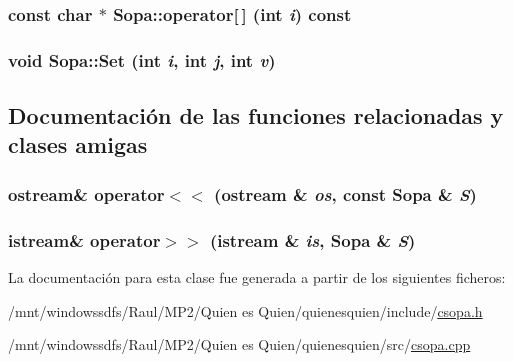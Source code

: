 \hypertarget{class_sopa_9b09ad8b8f618a7a21d93c074aba4b07}{
\subsubsection[{operator[]}]{\setlength{\rightskip}{0pt plus 5cm}const char $\ast$ Sopa::operator\mbox{[}$\,$\mbox{]} (int {\em i}) const}}
\label{class_sopa_9b09ad8b8f618a7a21d93c074aba4b07}


\hypertarget{class_sopa_47815b3d8dda011e75749387b43bfa92}{
\subsubsection[{Set}]{\setlength{\rightskip}{0pt plus 5cm}void Sopa::Set (int {\em i}, \/  int {\em j}, \/  int {\em v})}}
\label{class_sopa_47815b3d8dda011e75749387b43bfa92}




\subsection{Documentación de las funciones relacionadas y clases amigas}
\hypertarget{class_sopa_b487f8c25d6a206ddd694026397c2b5c}{
\subsubsection[{operator$<$$<$}]{\setlength{\rightskip}{0pt plus 5cm}ostream\& operator$<$$<$ (ostream \& {\em os}, \/  const {\bf Sopa} \& {\em S})}}
\label{class_sopa_b487f8c25d6a206ddd694026397c2b5c}


\hypertarget{class_sopa_18c0ca8c237f9bf2c95d59ba29c3cba4}{
\subsubsection[{operator$>$$>$}]{\setlength{\rightskip}{0pt plus 5cm}istream\& operator$>$$>$ (istream \& {\em is}, \/  {\bf Sopa} \& {\em S})}}
\label{class_sopa_18c0ca8c237f9bf2c95d59ba29c3cba4}




La documentación para esta clase fue generada a partir de los siguientes ficheros:\begin{CompactItemize}
\item 
/mnt/windowssdfs/Raul/MP2/Quien es Quien/quienesquien/include/\hyperlink{csopa_8h}{csopa.h}\item 
/mnt/windowssdfs/Raul/MP2/Quien es Quien/quienesquien/src/\hyperlink{csopa_8cpp}{csopa.cpp}\end{CompactItemize}
